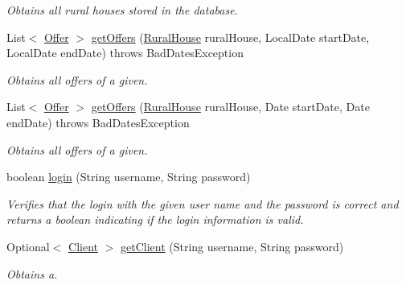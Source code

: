 \begin{DoxyCompactItemize}
\begin{DoxyCompactList}\small\item\em Obtains all rural houses stored in the database. \end{DoxyCompactList}\item 
List$<$ \mbox{\hyperlink{classcom_1_1ruralhousejsf_1_1domain_1_1_offer}{Offer}} $>$ \mbox{\hyperlink{classcom_1_1ruralhousejsf_1_1business_logic_1_1_application_facade_impl_a131acc04c80b3860f98d713d3a8ea5a5}{get\+Offers}} (\mbox{\hyperlink{classcom_1_1ruralhousejsf_1_1domain_1_1_rural_house}{Rural\+House}} rural\+House, Local\+Date start\+Date, Local\+Date end\+Date)  throws Bad\+Dates\+Exception 
\begin{DoxyCompactList}\small\item\em Obtains all offers of a given. \end{DoxyCompactList}\item 
List$<$ \mbox{\hyperlink{classcom_1_1ruralhousejsf_1_1domain_1_1_offer}{Offer}} $>$ \mbox{\hyperlink{classcom_1_1ruralhousejsf_1_1business_logic_1_1_application_facade_impl_a178d3964ff871edce1f5a207331319ed}{get\+Offers}} (\mbox{\hyperlink{classcom_1_1ruralhousejsf_1_1domain_1_1_rural_house}{Rural\+House}} rural\+House, Date start\+Date, Date end\+Date)  throws Bad\+Dates\+Exception 
\begin{DoxyCompactList}\small\item\em Obtains all offers of a given. \end{DoxyCompactList}\item 
boolean \mbox{\hyperlink{classcom_1_1ruralhousejsf_1_1business_logic_1_1_application_facade_impl_a7af883dece6a0de1e1be2b83e3d4a23f}{login}} (String username, String password)
\begin{DoxyCompactList}\small\item\em Verifies that the login with the given user name and the password is correct and returns a boolean indicating if the login information is valid. \end{DoxyCompactList}\item 
Optional$<$ \mbox{\hyperlink{classcom_1_1ruralhousejsf_1_1domain_1_1_client}{Client}} $>$ \mbox{\hyperlink{classcom_1_1ruralhousejsf_1_1business_logic_1_1_application_facade_impl_a249a902aa3507a04fb15ab5fcf1f082c}{get\+Client}} (String username, String password)
\begin{DoxyCompactList}\small\item\em Obtains a. \end{DoxyCompactList}\end{DoxyCompactItemize}
